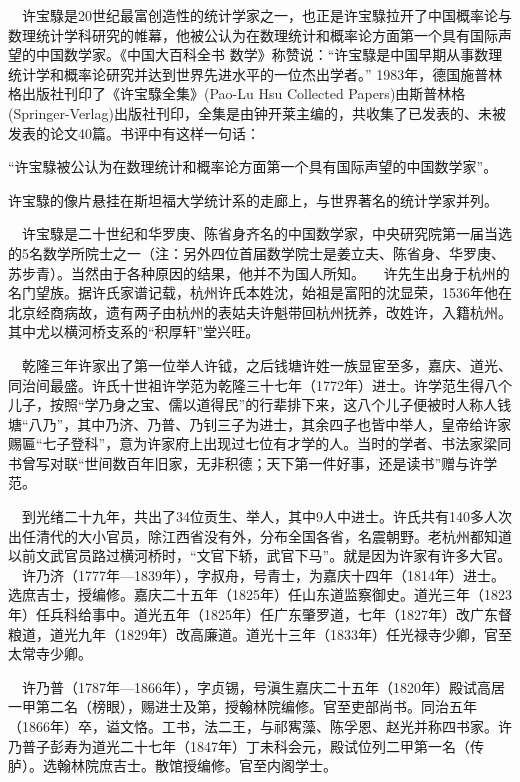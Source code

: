 \documentclass[a4paper,AutoFakeBold,oneside,12pt]{article}
\begin{document}
$\quad$许宝騄是20世纪最富创造性的统计学家之一，也正是许宝騄拉开了中国概率论与数理统计学科研究的帷幕，他被公认为在数理统计和概率论方面第一个具有国际声望的中国数学家。《中国大百科全书 数学》称赞说：“许宝騄是中国早期从事数理统计学和概率论研究并达到世界先进水平的一位杰出学者。” 1983年，德国施普林格出版社刊印了《许宝騄全集》(Pao-Lu Hsu Collected Papers)由斯普林格(Springer-Verlag)出版社刊印，全集是由钟开莱主编的，共收集了已发表的、未被发表的论文40篇。书评中有这样一句话：

“许宝騄被公认为在数理统计和概率论方面第一个具有国际声望的中国数学家”。

许宝騄的像片悬挂在斯坦福大学统计系的走廊上，与世界著名的统计学家并列。

$\quad$许宝騄是二十世纪和华罗庚、陈省身齐名的中国数学家，中央研究院第一届当选的5名数学所院士之一（注：另外四位首届数学院士是姜立夫、陈省身、华罗庚、苏步青）。当然由于各种原因的结果，他并不为国人所知。
	$\quad$许先生出身于杭州的名门望族。据许氏家谱记载，杭州许氏本姓沈，始祖是富阳的沈显荣，1536年他在北京经商病故，遗有两子由杭州的表姑夫许魁带回杭州抚养，改姓许，入籍杭州。其中尤以横河桥支系的“积厚轩”堂兴旺。 

$\quad$乾隆三年许家出了第一位举人许钺，之后钱塘许姓一族显宦至多，嘉庆、道光、同治间最盛。许氏十世祖许学范为乾隆三十七年（1772年）进士。许学范生得八个儿子，按照“学乃身之宝、儒以道得民”的行辈排下来，这八个儿子便被时人称人钱塘“八乃”，其中乃济、乃普、乃钊三子为进士，其余四子也皆中举人，皇帝给许家赐匾“七子登科”，意为许家府上出现过七位有才学的人。当时的学者、书法家梁同书曾写对联“世间数百年旧家，无非积德；天下第一件好事，还是读书”赠与许学范。

$\quad$到光绪二十九年，共出了34位贡生、举人，其中9人中进士。许氏共有140多人次出任清代的大小官员，除江西省没有外，分布全国各省，名震朝野。老杭州都知道以前文武官员路过横河桥时，“文官下轿，武官下马”。就是因为许家有许多大官。
	$\quad$许乃济（1777年—1839年），字叔舟，号青士，为嘉庆十四年（1814年）进士。选庶吉士，授编修。嘉庆二十五年（1825年）任山东道监察御史。道光三年（1823年）任兵科给事中。道光五年（1825年）任广东肇罗道，七年（1827年）改广东督粮道，道光九年（1829年）改高廉道。道光十三年（1833年）任光禄寺少卿，官至太常寺少卿。

$\quad$许乃普（1787年—1866年），字贞锡，号滇生嘉庆二十五年（1820年）殿试高居一甲第二名（榜眼），赐进士及第，授翰林院编修。官至吏部尚书。同治五年（1866年）卒，谥文恪。工书，法二王，与祁寯藻、陈孚恩、赵光并称四书家。许乃普子彭寿为道光二十七年（1847年）丁未科会元，殿试位列二甲第一名（传胪）。选翰林院庶吉士。散馆授编修。官至内阁学士。
\end{document}
